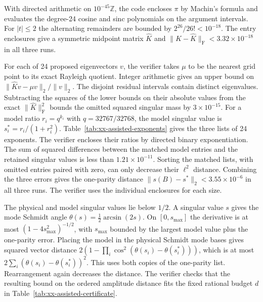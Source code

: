 With directed arithmetic on \(10^{-45}\mathbb Z\), the code encloses
\(\pi\) by Machin's formula and evaluates the degree-24 cosine and sinc
polynomials on the argument intervals. For \(|t|\le2\) the alternating
remainders are bounded by \(2^{26}/26!<10^{-18}\). The entry enclosures
give a symmetric midpoint matrix \(\widehat K\) and
\(\|K-\widehat K\|_{\mathrm F}<3.32\times10^{-18}\) in all three runs.

For each of 24 proposed eigenvectors \(v\), the verifier takes \(\mu\)
to be the nearest grid point to its exact Rayleigh quotient. Integer
arithmetic gives an upper bound on \(\|\widehat K v-\mu v\|_2/\|v\|_2\).
The disjoint residual intervals contain distinct eigenvalues.
Subtracting the squares of the lower bounds on their absolute values
from the exact \(\|\widehat K\|_{\mathrm F}^2\) bounds the omitted squared
singular mass by \(3\times10^{-15}\). For a model ratio \(r_i=q^{k_i}\)
with \(q=32767/32768\), the model singular value is \(s_i^*=r_i/(1+r_i^2)\).
Table~\ref{tab:xx-assisted-exponents} gives the three lists of 24 exponents.
The verifier encloses their ratios by directed binary exponentiation. The sum of squared differences
between the matched model entries and the retained singular values is
less than \(1.21\times10^{-11}\). Sorting the matched lists, with omitted
entries paired with zero, can only decrease their \(\ell^2\) distance.
Combining the three errors gives the one-parity distance
\(\|s(B)-s^*\|_2<3.55\times10^{-6}\) in all three runs. The verifier uses
the individual enclosures for each size.

The physical and model singular values lie below \(1/2\). A singular value
\(s\) gives the mode Schmidt angle \(\theta(s)=\tfrac12\arcsin(2s)\).
On \([0,s_{\max}]\) the derivative is at most
\((1-4s_{\max}^2)^{-1/2}\), with \(s_{\max}\) bounded by the largest
model value plus the one-parity error. Placing the model in the physical
Schmidt mode bases gives squared vector distance
\(2(1-\prod_i\cos^2(\theta(s_i)-\theta(s_i^*)))\), which is at most
\(2\sum_i(\theta(s_i)-\theta(s_i^*))^2\). This uses both copies of the
one-parity list. Rearrangement again decreases the distance. The verifier
checks that the resulting bound on the ordered amplitude distance fits
the fixed rational budget \(d\) in Table~\ref{tab:xx-assisted-certificate}.

